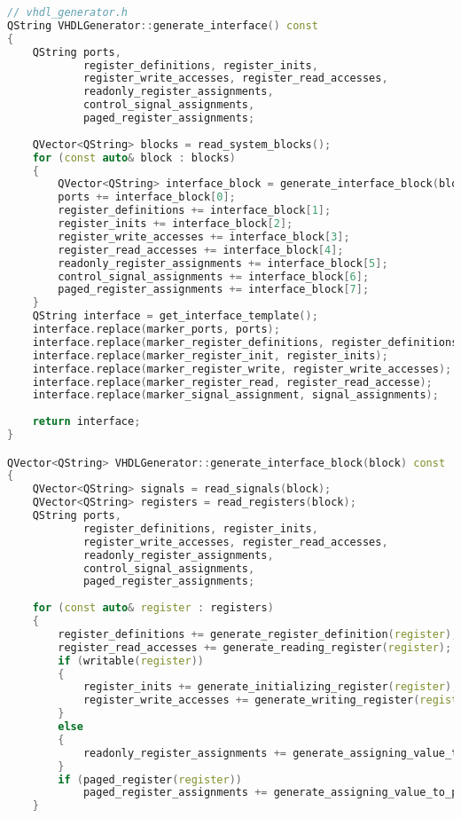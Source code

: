 \begin{lstlisting}[language=C++, caption={Logic of VHDL Interface Generation\label{lst:Logic of VHDL Interface Generation}}]
// vhdl_generator.h
QString VHDLGenerator::generate_interface() const
{
    QString ports,
            register_definitions, register_inits,
            register_write_accesses, register_read_accesses,
            readonly_register_assignments,
            control_signal_assignments,
            paged_register_assignments;
            
    QVector<QString> blocks = read_system_blocks();
    for (const auto& block : blocks)
    {
        QVector<QString> interface_block = generate_interface_block(block);
        ports += interface_block[0];
        register_definitions += interface_block[1];
        register_inits += interface_block[2];
        register_write_accesses += interface_block[3];
        register_read_accesses += interface_block[4];
        readonly_register_assignments += interface_block[5];
        control_signal_assignments += interface_block[6];
        paged_register_assignments += interface_block[7];
    }
    QString interface = get_interface_template();
    interface.replace(marker_ports, ports);
    interface.replace(marker_register_definitions, register_definitions);
    interface.replace(marker_register_init, register_inits);
    interface.replace(marker_register_write, register_write_accesses);
    interface.replace(marker_register_read, register_read_accesse);
    interface.replace(marker_signal_assignment, signal_assignments);
      
    return interface;
}

QVector<QString> VHDLGenerator::generate_interface_block(block) const
{
    QVector<QString> signals = read_signals(block);
    QVector<QString> registers = read_registers(block);
    QString ports,
            register_definitions, register_inits,
            register_write_accesses, register_read_accesses,
            readonly_register_assignments, 
            control_signal_assignments, 
            paged_register_assignments;
            
    for (const auto& register : registers)
    {
        register_definitions += generate_register_definition(register);
        register_read_accesses += generate_reading_register(register);
        if (writable(register))
        {
            register_inits += generate_initializing_register(register);
            register_write_accesses += generate_writing_register(register);
        }
        else
        {
            readonly_register_assignments += generate_assigning_value_to_readonly_register(register);
        }
        if (paged_register(register))
            paged_register_assignments += generate_assigning_value_to_paged_register(register);
    }
    

\end{lstlisting}

